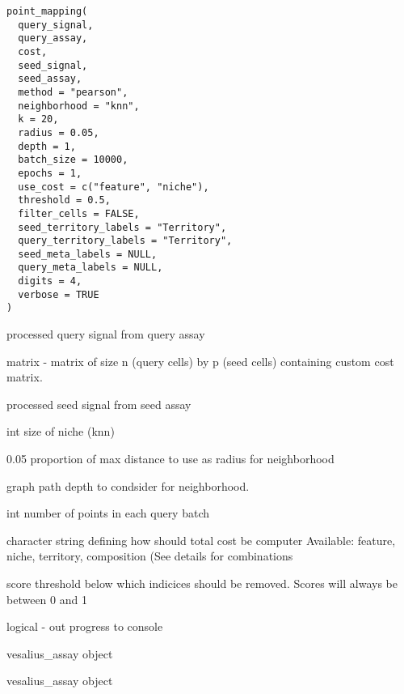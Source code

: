 \documentclass[a4paper]{book}
\begin{document}
%
\begin{Usage}
\begin{verbatim}
point_mapping(
  query_signal,
  query_assay,
  cost,
  seed_signal,
  seed_assay,
  method = "pearson",
  neighborhood = "knn",
  k = 20,
  radius = 0.05,
  depth = 1,
  batch_size = 10000,
  epochs = 1,
  use_cost = c("feature", "niche"),
  threshold = 0.5,
  filter_cells = FALSE,
  seed_territory_labels = "Territory",
  query_territory_labels = "Territory",
  seed_meta_labels = NULL,
  query_meta_labels = NULL,
  digits = 4,
  verbose = TRUE
)
\end{verbatim}
\end{Usage}
%
\begin{Arguments}
\begin{ldescription}
\item[\code{query\_signal}] processed query signal from query assay

\item[\code{cost}] matrix - matrix of size n (query cells) by p (seed cells)
containing custom cost matrix.

\item[\code{seed\_signal}] processed seed signal from seed assay

\item[\code{k}] int size of niche (knn)

\item[\code{radius}] 0.05 proportion of max distance to use as radius for 
neighborhood

\item[\code{depth}] graph path depth to condsider for neighborhood.

\item[\code{batch\_size}] int number of points in each query batch

\item[\code{use\_cost}] character string defining how should total cost be computer
Available: feature, niche, territory, composition (See details for combinations

\item[\code{threshold}] score threshold below which indicices should be removed.
Scores will always be between 0 and 1

\item[\code{verbose}] logical - out progress to console

\item[\code{query}] vesalius\_assay object

\item[\code{seed}] vesalius\_assay object
\end{ldescription}
\end{Arguments}
\end{document}
